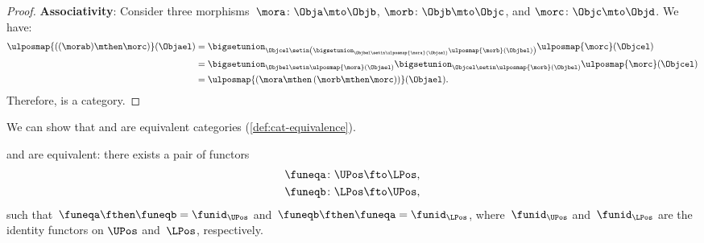 \begin{proof}
    \textbf{Associativity}:
    Consider three morphisms~$\mora\colon \Obja \mto \Objb$, $\morb\colon \Objb\mto \Objc$, and $\morc \colon \Objc\mto \Objd$.
    We have:
    \begin{equation}
        \begin{aligned}
            \ulposmap{\left( (\morab) \mthen \morc\right)}(\Objael) & =
            \bigsetunion_{\Objcel \setin \left( \bigsetunion_{\Objbel \setin \ulposmap{\mora}(\Objael)}\ulposmap{\morb}(\Objbel)\right)}\ulposmap{\morc}(\Objcel) \\
                                                                    & =\bigsetunion_{\Objbel\setin \ulposmap{\mora}(\Objael)}\bigsetunion_{\Objcel\setin \ulposmap{\morb}(\Objbel)}\ulposmap{\morc}(\Objcel) \\
                                                                    & =\ulposmap{\left( \mora \mthen \left( \morb\mthen \morc\right)\right)}(\Objael).
        \end{aligned}
    \end{equation}
    Therefore, \UPos is a category.
\end{proof}

We can show that \UPos and \LPos are equivalent categories (\cref{def:cat-equivalence}).

\begin{lemma}
    \label{lem:ulposequiv}
    \UPos and \LPos are equivalent: there exists a pair of functors
    \begin{equation}
        \begin{aligned}
            \funeqa\colon \UPos & \fto \LPos, \\
            \funeqb\colon \LPos & \fto \UPos,
        \end{aligned}
    \end{equation}
    such that~$\funeqa \fthen \funeqb=\funid_{\UPos}$ and~$\funeqb \fthen \funeqa=\funid_{\LPos}$, where~$\funid_{\UPos}$ and~$\funid_{\LPos}$ are the identity functors on $\UPos$ and~$\LPos$, respectively.
\end{lemma}

